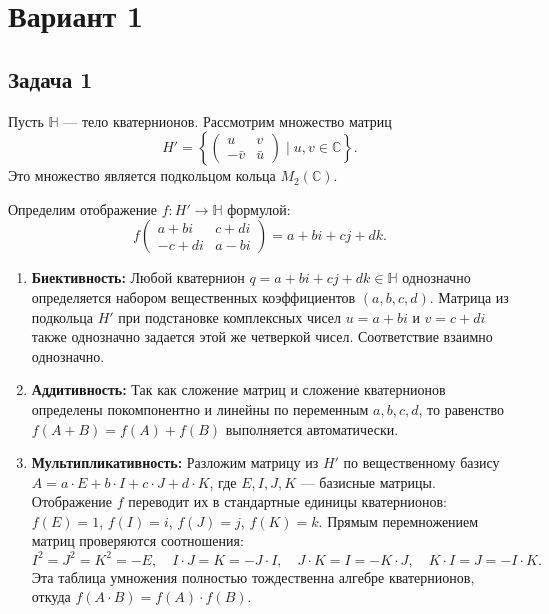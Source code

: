 \documentclass[14pt]{article}
\begin{document}
	
	\section{Вариант 1}
	
	\subsection*{Задача 1}
	Пусть $\mathbb{H}$ — тело кватернионов. Рассмотрим множество матриц
	\[
	H' = \left\{ 
	\begin{pmatrix} 
		u & v \\ 
		-\bar{v} & \bar{u} 
	\end{pmatrix} \;\bigg|\; u, v \in \mathbb{C} 
	\right\}.
	\]
	Это множество является подкольцом кольца $M_2(\mathbb{C})$.
	
	Определим отображение $f: H' \to \mathbb{H}$ формулой:
	\[
	f \begin{pmatrix} 
		a+bi & c+di \\ 
		-c+di & a-bi 
	\end{pmatrix} 
	= a + bi + cj + dk.
	\]
	
	\begin{enumerate}
		\item \textbf{Биективность:} Любой кватернион $q = a + bi + cj + dk \in \mathbb{H}$ однозначно определяется набором вещественных коэффициентов $(a, b, c, d)$. Матрица из подкольца $H'$ при подстановке комплексных чисел $u = a + bi$ и $v = c + di$ также однозначно задается этой же четверкой чисел. Соответствие взаимно однозначно.
		
		\item \textbf{Аддитивность:} Так как сложение матриц и сложение кватернионов определены покомпонентно и линейны по переменным $a, b, c, d$, то равенство $f(A + B) = f(A) + f(B)$ выполняется автоматически.
		
		\item \textbf{Мультипликативность:} Разложим матрицу из $H'$ по вещественному базису $A = a \cdot E + b \cdot I + c \cdot J + d \cdot K$, где $E, I, J, K$ — базисные матрицы. Отображение $f$ переводит их в стандартные единицы кватернионов: $f(E)=1$, $f(I)=i$, $f(J)=j$, $f(K)=k$. Прямым перемножением матриц проверяются соотношения:
		\[
		I^2 = J^2 = K^2 = -E, \quad I \cdot J = K = -J \cdot I, \quad J \cdot K = I = -K \cdot J, \quad K \cdot I = J = -I \cdot K.
		\]
		Эта таблица умножения полностью тождественна алгебре кватернионов, откуда $f(A \cdot B) = f(A) \cdot f(B)$.
	\end{enumerate}
	
\end{document}
